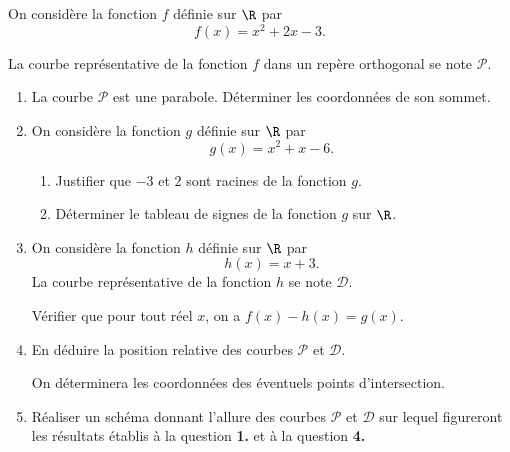 On considère la fonction $f$ définie sur $\R$ par
\[ f(x) = x^2+2x-3. \]

La courbe représentative de la fonction $f$ dans un repère orthogonal se note $\mathcal{P}$.

\begin{enumerate}
	\item La courbe $\mathcal{P}$ est une parabole. Déterminer les coordonnées de son sommet.

	\item On considère la fonction $g$ définie sur $\R$ par
	\[ g(x) = x^2+x-6. \]
	\begin{enumerate}
		\item Justifier que $-3$ et $2$ sont racines de la fonction $g$.
		\item Déterminer le tableau de signes de la fonction $g$ sur $\R$.
	\end{enumerate}

	\item On considère la fonction $h$ définie sur $\R$ par
	\[ h(x) = x+3. \]
	La courbe représentative de la fonction $h$ se note $\mathcal{D}$.

	Vérifier que pour tout réel $x$, on a $f(x) - h(x) = g(x)$.

	\item En déduire la position relative des courbes $\mathcal{P}$ et $\mathcal{D}$.

	On déterminera les coordonnées des éventuels points d'intersection.

	\item Réaliser un schéma donnant l'allure des courbes $\mathcal{P}$ et $\mathcal{D}$ sur lequel figureront les résultats établis à la question \textbf{1.} et à la question \textbf{4.}
\end{enumerate}
